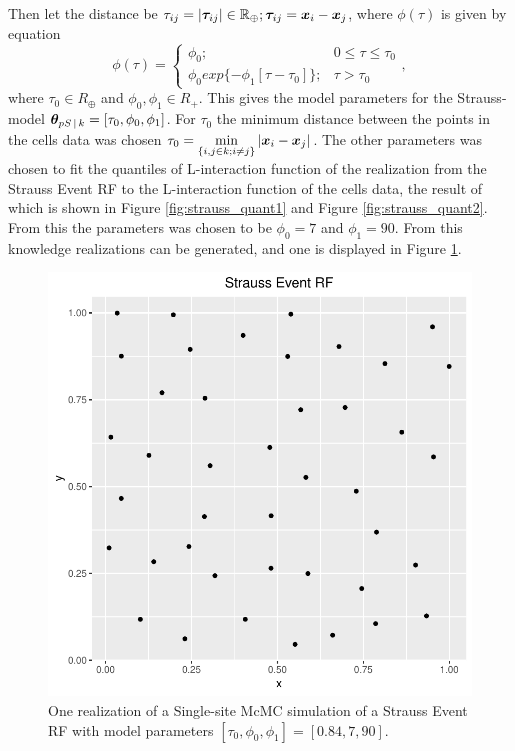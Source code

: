 Then let the distance be $\tau_{ij} = |\bm{\tau}_{ij}| \in \mathbb{R}_\oplus; \bm{\tau}_{ij} = \bm{x}_i - \bm{x}_j$, where $\phi(\tau)$ is given by equation 
\begin{equation}
    \phi(\tau) = \begin{cases}
                    \phi_0; & 0 \leq \tau \leq \tau_0\\
                    \phi_0 exp\{-\phi_1[\tau-\tau_0]\}; & \tau > \tau_0
                \end{cases},
    \label{eq:interfunction}
\end{equation}
where $\tau_0 \in R_\oplus$ and $\phi_0,\phi_1 \in R_+$. This gives the model parameters for the Strauss-model $\bm{\theta} _{pS\, | \, k} = [\tau_0,\phi_0,\phi_1]$. For $\tau_0$ the minimum distance between the points in the cells data was chosen $\tau_0 = \min\limits_{\{i,j\in k;i\neq j\}} |\bm{x}_i-\bm{x}_j|$. The other parameters was chosen to fit the quantiles of L-interaction function of the realization from the Strauss Event RF to the L-interaction function of the cells data, the result of which is shown in Figure \ref{fig:strauss_quant1} and  Figure \ref{fig:strauss_quant2}. From this the parameters was chosen to be $\phi_0 = 7$ and $\phi_1 = 90$. From this knowledge realizations can be generated, and one is displayed in Figure \ref{fig:repulsive_event_rf}.
\begin{figure}
    \centering
    \includegraphics[scale=0.95]{figures/repulsive_event_rf.pdf}
    \caption{One realization of a Single-site McMC simulation of a Strauss Event RF with model parameters $[\tau_0,\phi_0,\phi_1] = [0.84,7,90]$.}
    \label{fig:repulsive_event_rf}
\end{figure}

